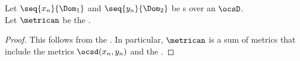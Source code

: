 \begin{proposition}
Let $\seq{x_n}{\Dom_1}$ and $\seq{y_n}{\Dom_2}$ be s over an  $\ocsD$.\\
Let $\metrican$ be the .
\end{proposition}
\begin{proof}
This follows from the  .
In particular, $\metrican$ is a sum of metrics that include
the metrics $\ocsd(x_n,y_n)$ and the  .
%
%
\end{proof}

